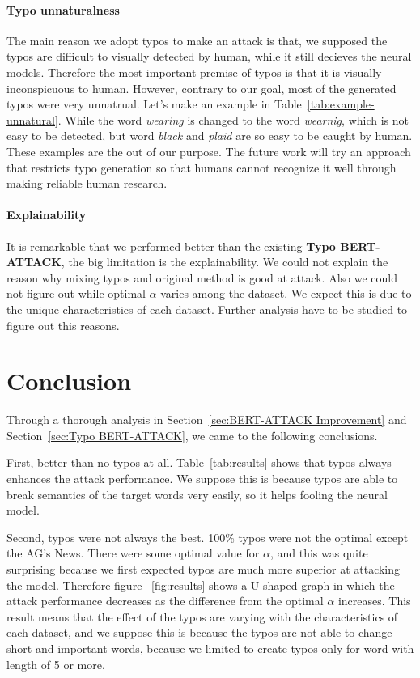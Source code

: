 \documentclass[11pt,a4paper]{article}
\begin{document}
\paragraph{Typo unnaturalness} The main reason we adopt typos to make an attack is that, we supposed the typos are difficult to visually detected by human, while it still decieves the neural models. Therefore the most important premise of typos is that it is visually inconspicuous to human. However, contrary to our goal, most of the generated typos were very unnatrual. Let's make an example in Table~\ref{tab:example-unnatural}. While the word \textit{wearing} is changed to the word \textit{wearnig}, which is not easy to be detected, but word \textit{black} and \textit{plaid} are so easy to be caught by human. These examples are the out of our purpose. The future work will try an approach that restricts typo generation so that humans cannot recognize it well through making reliable human research.
\paragraph{Explainability} It is remarkable that we performed better than the existing \textbf{Typo BERT-ATTACK}, the big limitation is the explainability. We could not explain the reason why mixing typos and original method is good at attack. Also we could not figure out while optimal $\alpha$ varies among the dataset. We expect this is due to the unique characteristics of each dataset. Further analysis have to be studied to figure out this reasons.


\section{Conclusion}
Through a thorough analysis in Section~\ref{sec:BERT-ATTACK Improvement} and Section~\ref{sec:Typo BERT-ATTACK}, we came to the following conclusions.

First, better than no typos at all. Table~\ref{tab:results} shows that typos always enhances the attack performance. We suppose this is because typos are able to break semantics of the target words very easily, so it helps fooling the neural model. 

Second, typos were not always the best. 100\% typos were not the optimal except the AG's News. There were some optimal value for $\alpha$, and this was quite surprising because we first expected typos are much more superior at attacking the model. Therefore figure ~\ref{fig:results} shows a U-shaped graph in which the attack performance decreases as the difference from the optimal $\alpha$ increases. This result means that the effect of the typos are varying with the characteristics of each dataset, and we suppose this is because the typos are not able to change short and important words, because we limited to create typos only for word with length of 5 or more. 
\end{document}
